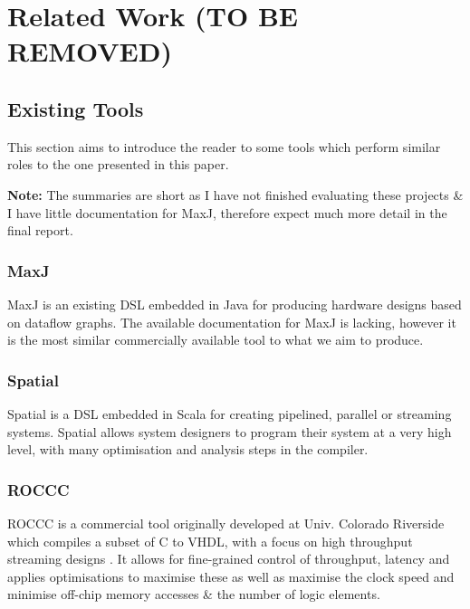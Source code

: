 \chapter{Related Work (TO BE REMOVED)}
\section{Existing Tools}
This section aims to introduce the reader to some tools which perform similar roles to the one presented in this paper.

\noindent
\textbf{Note:} The summaries are short as I have not finished evaluating these projects \& I have little documentation for MaxJ, therefore expect much more detail in the final report.

\subsection{MaxJ}
MaxJ is an existing DSL embedded in Java for producing hardware designs based on dataflow graphs. The available documentation for MaxJ is lacking, however it is the most similar commercially available tool to what we aim to produce.

\subsection{Spatial}
Spatial is a DSL embedded in Scala for creating pipelined, parallel or streaming systems. Spatial allows system designers to program their system at a very high level, with many optimisation and analysis steps in the compiler.

\subsection{ROCCC}
ROCCC is a commercial tool originally developed at Univ. Colorado Riverside which compiles a subset of C to VHDL, with a focus on high throughput streaming designs \cite{5474060}. It allows for fine-grained control of throughput, latency and applies optimisations to maximise these as well as maximise the clock speed and minimise off-chip memory accesses \& the number of logic elements.

